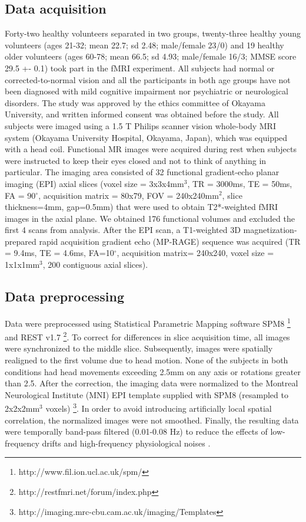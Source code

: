 \documentclass[12pt,a4paper]{article}
\begin{document}
\subsection{Data acquisition}

Forty-two healthy volunteers separated in two groups, twenty-three healthy young volunteers (ages 21-32; mean 22.7; sd 2.48; male/female 23/0) and 19 healthy older volunteers (ages 60-78; mean 66.5; sd 4.93; male/female 16/3; MMSE score 29.5 +- 0.1) took part in the fMRI experiment. 
All subjects had
normal or corrected-to-normal vision and all the participants in both age groups have not been diagnosed with mild cognitive impairment nor psychiatric or neurological disorders. 
The study was approved by the ethics
committee of Okayama University, and written informed consent was obtained before the study. All subjects were imaged using a 1.5 T Philips scanner vision whole-body MRI system (Okayama University Hospital, Okayama, Japan), which was equipped with a head coil. Functional MR images were acquired during rest when subjects were
 instructed to keep their eyes closed and not to think of anything in
 particular. The imaging area consisted of 32 functional gradient-echo planar
 imaging (EPI) axial slices (voxel size = 3x3x4mm$^3$, TR = 3000ms, TE = 50ms,
 FA = 90$^\circ$, acquisition matrix = 80x79, FOV = 240x240mm$^2$, slice thickness=4mm, gap=0.5mm) that were used to obtain T2*-weighted fMRI images in the
 axial plane. We obtained 176 functional volumes and excluded the first 4 scans
 from analysis. After the EPI scan, a T1-weighted 3D magnetization-prepared
 rapid acquisition gradient echo (MP-RAGE) sequence was acquired (TR = 9.4ms, TE = 4.6ms, FA=10$^\circ$, acquisition matrix= 240x240, voxel size = 1x1x1mm$^3$, 200 contiguous axial slices).

\subsection{Data preprocessing} 
Data were preprocessed using Statistical Parametric Mapping software SPM8
\footnote{http://www.fil.ion.ucl.ac.uk/spm/} and REST v1.7
\footnote{http://restfmri.net/forum/index.php}. To correct for differences in
slice acquisition time, all images were synchronized to the middle slice.
Subsequently, images were spatially realigned to the first volume due to head
motion. None of the subjects in both conditions had head movements exceeding 2.5mm on any axis or
rotations greater than 2.5\textdegree. After the correction,  the imaging data were
normalized to the Montreal Neurological Institute (MNI) EPI template supplied
with SPM8 (resampled to 2x2x2mm$^3$ voxels) \footnote{http://imaging.mrc-cbu.cam.ac.uk/imaging/Templates}. In order to avoid introducing artificially local spatial correlation, the normalized images were
not smoothed. Finally, the resulting data were temporally band-pass filtered
(0.01-0.08 Hz) to reduce the effects of low-frequency drifts and high-frequency
physiological noises \citep{jiao_granger_2011}.
\end{document}
